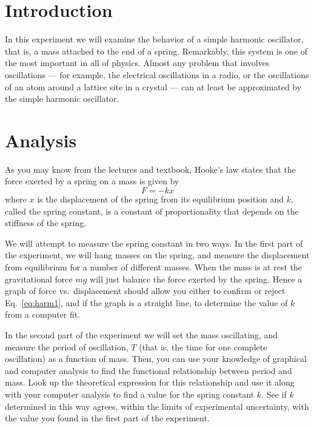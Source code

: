 \newexp
\section*{Introduction}
     In this experiment we will examine the behavior of a simple 
harmonic oscillator, that is, a mass attached to the end of a 
spring.  Remarkably, this system is one of the most important 
in all of physics.  Almost any problem that involves 
oscillations --- for example, the electrical oscillations in a 
radio, or the oscillations of an atom around a lattice site in a 
crystal --- can at least be approximated by the simple harmonic 
oscillator.

\section*{Analysis}
     As you may know from the lectures and textbook, Hooke's law 
states that the force exerted by a spring on a mass is given by
\begin{equation}
F = - kx   \label{eq:harm1}
\end{equation}
where $x$ is the displacement of the spring from its equilibrium 
position and $k$, called the spring constant, is a constant 
of proportionality that depends on the stiffness of the spring.

     We will attempt to measure the spring constant in two ways.  
In the first part of the experiment, we will hang masses on the 
spring, and measure the displacement from equilibrium for a 
number of different masses.  When the mass is at rest the 
gravitational force $mg$ will just balance the force exerted by the 
spring.  Hence a graph of force vs.\ displacement should allow you 
either to confirm or reject Eq.~\ref{eq:harm1}, and if the graph is a 
straight line, to determine the value of $k$ from a computer fit.

     In the second part of the experiment we will set the mass 
oscillating, and measure the period of oscillation, $T$ (that is, the 
time for one complete oscillation) as a function of mass.  Then, 
you can use your knowledge of graphical and computer analysis to 
find the functional relationship between period and mass.  Look 
up the theoretical expression for this relationship and use it 
along with your computer analysis to find a value for the spring 
constant $k$.  See if $k$ determined in this way agrees, within the 
limits of experimental uncertainty, with the value you found in 
the first part of the experiment.

